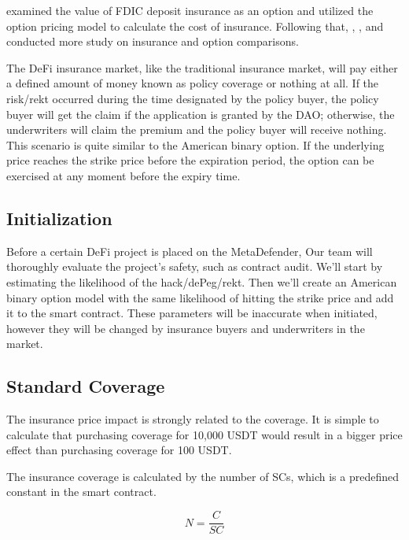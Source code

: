 \cite{Marcus et al., 1984} examined the value of FDIC deposit insurance as an option and utilized the option pricing model to calculate the cost of insurance.
Following that, \cite{RONN et al., 1986}, \cite{Laeven et al., 2002}, and \cite{Falkenheim et al., 2003} conducted more study on insurance and option comparisons.

The DeFi insurance market, like the traditional insurance market, will pay either a defined amount of money known as policy coverage or nothing at all.
If the risk/rekt occurred during the time designated by the policy buyer, the policy buyer will get the claim if the application is granted by the DAO; otherwise, the underwriters will claim the premium and the policy buyer will receive nothing.
This scenario is quite similar to the American binary option.
If the underlying price reaches the strike price before the expiration period, the option can be exercised at any moment before the expiry time.

\subsection{Initialization}\label{subsec:initialization}

Before a certain DeFi project is placed on the MetaDefender, Our team will thoroughly evaluate the project's safety, such as contract audit.
We'll start by estimating the likelihood of the hack/dePeg/rekt.
Then we'll create an American binary option model with the same likelihood of hitting the strike price and add it to the smart contract.
These parameters will be inaccurate when initiated, however they will be changed by insurance buyers and underwriters in the market.

\subsection{Standard Coverage}\label{subsec:standard-coverage}

The insurance price impact is strongly related to the coverage.
It is simple to calculate that purchasing coverage for 10,000 USDT would result in a bigger price effect than purchasing coverage for 100 USDT.

The insurance coverage is calculated by the number of SCs, which is a predefined constant in the smart contract.

\begin{equation}
	N = \frac{C}{SC}\label{eq:equation}
\end{equation}

